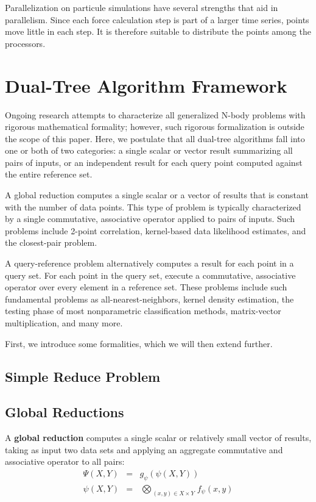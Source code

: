 \documentclass[times, leqno,twocolumn]{article}
\newcommand{\defterm}[1]{{\bf #1}}
\newcommand{\myOp}[1]{\mathop{\bigotimes\nolimits\!\!_{#1}}}
\newcommand{\letterglob}{\psi}
\newcommand{\outglob}{\Psi}
\newcommand{\inglob}{\psi}
\newcommand{\Opglob}{\myOp{\letterglob}}
\newcommand{\fglob}{f_{\letterglob}}
\newcommand{\gglob}{g_{\letterglob}}
\begin{document}
Parallelization on particule simulations have several strengths that aid in parallelism.
Since each force calculation step is part of a larger time series, points move little in each step.
It is therefore suitable to distribute the points among the processors.

\section{Dual-Tree Algorithm Framework}

Ongoing research attempts to characterize all generalized N-body problems with rigorous mathematical formality; however, such rigorous formalization is outside the scope of this paper.
Here, we postulate that all dual-tree algorithms fall into one or both of two categories: a single scalar or vector result summarizing all pairs of inputs, or an independent result for each query point computed against the entire reference set.

A global reduction computes a single scalar or a vector of results that is constant with the number of data points.
This type of problem is typically characterized by a single commutative, associative operator applied to pairs of inputs.
Such problems include 2-point correlation, kernel-based data likelihood estimates, and the closest-pair problem.

A query-reference problem alternatively computes a result for each point in a query set.
For each point in the query set, execute a commutative, associative operator over every element in a reference set.
These problems include such fundamental problems as all-nearest-neighbors, kernel density estimation, the testing phase of most nonparametric classification methods, matrix-vector multiplication, and many more.

First, we introduce some formalities, which we will then extend further.

\subsection{Simple Reduce Problem}

\subsection{Global Reductions}

A \defterm{global reduction} computes a single scalar or relatively small vector of results, taking as input two data sets and applying an aggregate commutative and associative operator to all pairs:
\begin{eqnarray*}
\outglob(X, Y) &=& \gglob(\inglob(X, Y))
\\
\inglob(X, Y) &=& \Opglob_{(x, y) \in X \times Y} \fglob(x, y)
\label{eqn:defglob}
\end{eqnarray*}
\end{document}
